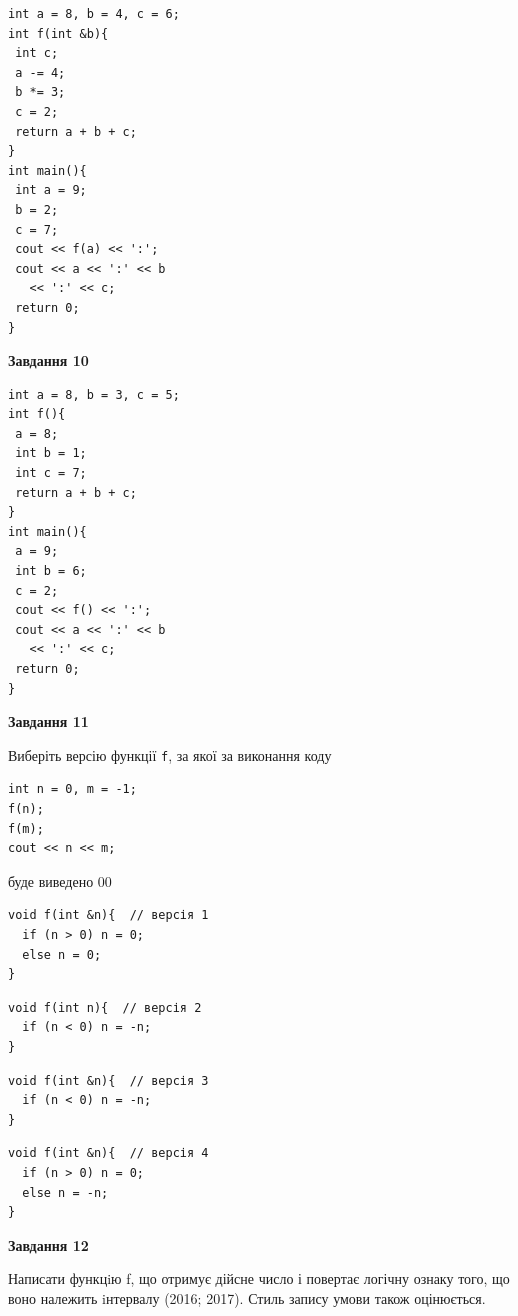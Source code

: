 \documentclass[12pt, ukrainian]{article}
\def\code#1{\Verb!#1!}
\begin{document}
{\begin {large}
\begin{minipage}[t]{7.0cm}
\begin{verbatim}
int a = 8, b = 4, c = 6;
int f(int &b){
 int c;
 a -= 4;
 b *= 3;
 c = 2;
 return a + b + c;
}
int main(){
 int a = 9;
 b = 2;
 c = 7;
 cout << f(a) << ':';
 cout << a << ':' << b 
   << ':' << c;
 return 0;
}
\end{verbatim}



\begin{center}
\textbf{Завдання 10}
\end{center}
\vspace{-8mm}

\begin{verbatim}
int a = 8, b = 3, c = 5;
int f(){
 a = 8;
 int b = 1;
 int c = 7;
 return a + b + c;
}
int main(){
 a = 9;
 int b = 6;
 c = 2;
 cout << f() << ':';
 cout << a << ':' << b 
   << ':' << c;
 return 0;
}
\end{verbatim}

\end{minipage}
\vline \hspace{1mm}
\begin{minipage}[t]{11.0cm}

\begin{center}
\textbf{Завдання 11}
\end{center}
Виберіть версію функції \code{f}, за якої за виконання коду
\begin{verbatim}
int n = 0, m = -1;
f(n);
f(m);
cout << n << m;
\end{verbatim}

буде виведено 00

\begin{verbatim}
void f(int &n){  // версія 1
  if (n > 0) n = 0;
  else n = 0;
}
\end{verbatim}

\vspace{-8mm}\begin{verbatim}
void f(int n){  // версія 2
  if (n < 0) n = -n;
}
\end{verbatim}

\vspace{-8mm}\begin{verbatim}
void f(int &n){  // версія 3
  if (n < 0) n = -n;
}
\end{verbatim}

\vspace{-8mm}\begin{verbatim}
void f(int &n){  // версія 4
  if (n > 0) n = 0;
  else n = -n;
}
\end{verbatim}



\begin{center}
\textbf{Завдання 12}
\end{center}

Написати функцiю f, що отримує дійсне число і повертає логічну ознаку того, що воно належить iнтервалу (2016; 2017). Стиль запису умови також оцінюється.\par

\end{minipage}

\end {large}}
\newpage
\end{document}
